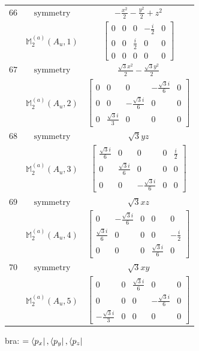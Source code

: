 \documentclass[fleqn,8pt,landscape]{jsarticle}
\begin{document}
\begin{longtable}{ccc}
$ 66 $ & $ \text{symmetry} $ & $ - \frac{x^{2}}{2} - \frac{y^{2}}{2} + z^{2} $ \\
$  $ & $ \mathbb{M}_{2}^{(a)}(A_{u},1) $ & $ \begin{bmatrix} 0 & 0 & 0 & - \frac{i}{2} & 0 \\ 0 & 0 & \frac{i}{2} & 0 & 0 \\ 0 & 0 & 0 & 0 & 0 \end{bmatrix} $ \\ \hline
$ 67 $ & $ \text{symmetry} $ & $ \frac{\sqrt{3} x^{2}}{2} - \frac{\sqrt{3} y^{2}}{2} $ \\
$  $ & $ \mathbb{M}_{2}^{(a)}(A_{u},2) $ & $ \begin{bmatrix} 0 & 0 & 0 & - \frac{\sqrt{3} i}{6} & 0 \\ 0 & 0 & - \frac{\sqrt{3} i}{6} & 0 & 0 \\ 0 & \frac{\sqrt{3} i}{3} & 0 & 0 & 0 \end{bmatrix} $ \\ \hline
$ 68 $ & $ \text{symmetry} $ & $ \sqrt{3} y z $ \\
$  $ & $ \mathbb{M}_{2}^{(a)}(A_{u},3) $ & $ \begin{bmatrix} \frac{\sqrt{3} i}{6} & 0 & 0 & 0 & \frac{i}{2} \\ 0 & \frac{\sqrt{3} i}{6} & 0 & 0 & 0 \\ 0 & 0 & - \frac{\sqrt{3} i}{6} & 0 & 0 \end{bmatrix} $ \\ \hline
$ 69 $ & $ \text{symmetry} $ & $ \sqrt{3} x z $ \\
$  $ & $ \mathbb{M}_{2}^{(a)}(A_{u},4) $ & $ \begin{bmatrix} 0 & - \frac{\sqrt{3} i}{6} & 0 & 0 & 0 \\ \frac{\sqrt{3} i}{6} & 0 & 0 & 0 & - \frac{i}{2} \\ 0 & 0 & 0 & \frac{\sqrt{3} i}{6} & 0 \end{bmatrix} $ \\ \hline
$ 70 $ & $ \text{symmetry} $ & $ \sqrt{3} x y $ \\
$  $ & $ \mathbb{M}_{2}^{(a)}(A_{u},5) $ & $ \begin{bmatrix} 0 & 0 & \frac{\sqrt{3} i}{6} & 0 & 0 \\ 0 & 0 & 0 & - \frac{\sqrt{3} i}{6} & 0 \\ - \frac{\sqrt{3} i}{3} & 0 & 0 & 0 & 0 \end{bmatrix} $ \\ \hline
\end{longtable}
bra: $=\bra{p_{x}}, \bra{p_{y}}, \bra{p_{z}}$
\end{document}
